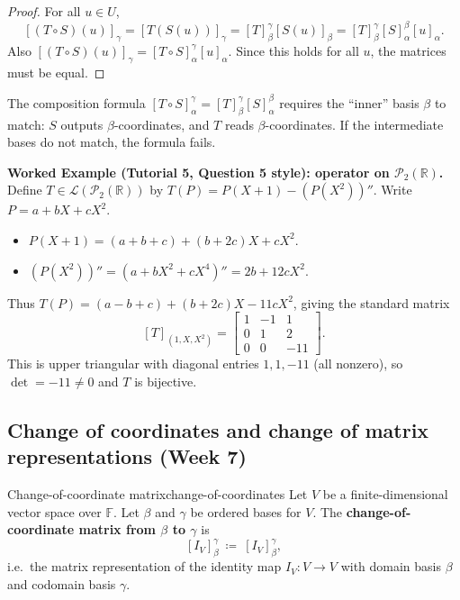 \begin{proof}
For all $u\in U$,
\[
[(T\circ S)(u)]_\gamma=[T(S(u))]_\gamma=[T]^{\gamma}_{\beta}[S(u)]_\beta
=[T]^{\gamma}_{\beta}[S]^{\beta}_{\alpha}[u]_\alpha.
\]
Also $[(T\circ S)(u)]_\gamma=[T\circ S]^{\gamma}_{\alpha}[u]_\alpha$.
Since this holds for all $u$, the matrices must be equal.

\end{proof}

The composition formula $[T\circ S]^{\gamma}_{\alpha}=[T]^{\gamma}_{\beta}[S]^{\beta}_{\alpha}$ requires the ``inner'' basis $\beta$ to match: $S$ outputs $\beta$-coordinates, and $T$ reads $\beta$-coordinates. If the intermediate bases do not match, the formula fails.

\begin{examplebox}
\textbf{Worked Example (Tutorial 5, Question 5 style): operator on $\mathcal{P}_2(\mathbb{R})$.}
Define $T\in\mathcal{L}(\mathcal{P}_2(\mathbb{R}))$ by $T(P)=P(X+1)-(P(X^2))''$.
Write $P=a+bX+cX^2$.
\begin{itemize}
\item $P(X+1)=(a+b+c)+(b+2c)X+cX^2$.
\item $(P(X^2))''=(a+bX^2+cX^4)''=2b+12cX^2$.
\end{itemize}
Thus $T(P)=(a-b+c)+(b+2c)X-11cX^2$, giving the standard matrix
\[
[T]_{(1,X,X^2)}=\begin{bmatrix}1&-1&1\\0&1&2\\0&0&-11\end{bmatrix}.
\]
This is upper triangular with diagonal entries $1,1,-11$ (all nonzero), so $\det=-11\neq 0$ and $T$ is bijective.
\end{examplebox}


\subsection{Change of coordinates and change of matrix representations (Week 7)}

\begin{definition}{Change-of-coordinate matrix}{change-of-coordinates}
Let $V$ be a finite-dimensional vector space over $\mathbb{F}$.
Let $\beta$ and $\gamma$ be ordered bases for $V$.
The \textbf{change-of-coordinate matrix from $\beta$ to $\gamma$} is
\[
[I_V]^{\gamma}_{\beta}\ \coloneqq\ [I_V]^{\gamma}_{\beta},
\]
i.e.\ the matrix representation of the identity map $I_V:V\to V$ with domain basis $\beta$ and codomain basis $\gamma$.

\end{definition}

